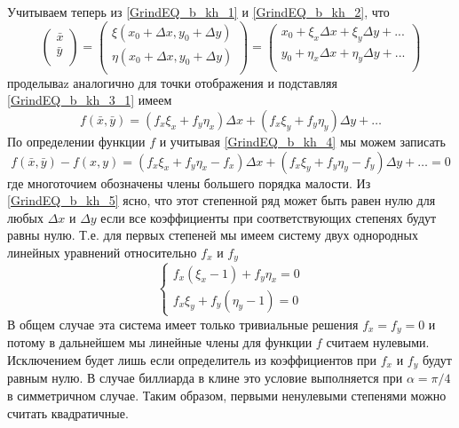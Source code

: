 \documentclass[a4paper]{article}
\begin{document}
Учитываем теперь из \eqref{GrindEQ_b_kh_1} и \eqref{GrindEQ_b_kh_2}, что 
\begin{equation} \label{GrindEQ_b_kh_3_1}
\left(
\begin{array}{c}
 \bar{x} \\
 \bar{y} \\
\end{array}
\right)=\left(
\begin{array}{c}
 \xi (x_0+\Delta x,y_0+\Delta y) \\
 \eta (x_0+\Delta x,y_0+\Delta y) \\
\end{array}\right)=\left(
\begin{array}{c}
 x_0+\xi_x\Delta x+\xi_y \Delta y+... \\
 y_0+\eta_x\Delta x+\eta_y \Delta y+... \\
\end{array}
\right)
\end{equation}
проделываz аналогично для точки отображения и подставляя \eqref{GrindEQ_b_kh_3_1} имеем
\begin{equation} \label{GrindEQ_b_kh_4}
f(\bar{x},\bar{y})=(f_x \xi_x+f_y \eta_x)\Delta x+(f_x \xi_y+f_y \eta_y)\Delta y+\ldots
\end{equation}
По определении функции $f$ и учитывая \eqref{GrindEQ_b_kh_4} мы можем записать
\begin{equation} \label{GrindEQ_b_kh_5}
f(\bar{x},\bar{y})-f(x,y)=(f_x \xi_x+f_y \eta_x-f_x)\Delta x+(f_x \xi_y+f_y \eta_y-f_y)\Delta y+\ldots=0
\end{equation}
где многоточием обозначены члены большего порядка малости. Из \eqref{GrindEQ_b_kh_5} ясно, что этот степенной ряд может быть равен нулю для любых $\Delta x$ и $\Delta y$ если все коэффициенты при соответствующих степенях будут равны нулю. Т.е. для первых степеней мы имеем систему двух однородных линейных уравнений относительно $f_x$ и $f_y$
\begin{equation} \label{GrindEQ_b_kh_6}
\begin{cases} f_x(\xi_x-1) +f_y \eta_x=0\\
f_x \xi_y+f_y(\eta_y-1)=0
\end{cases}
\end{equation}
В общем случае эта система имеет только тривиальные решения $f_x=f_y=0$ и потому в дальнейшем мы линейные члены для функции $f$ считаем нулевыми. Исключением будет лишь если определитель из коэффициентов при $f_x$ и $f_y$ будут равным нулю. В случае биллиарда в клине это условие  выполняется при $\alpha=\pi/4$ в симметричном случае. Таким образом, первыми ненулевыми степенями можно считать квадратичные. 
\end{document}
